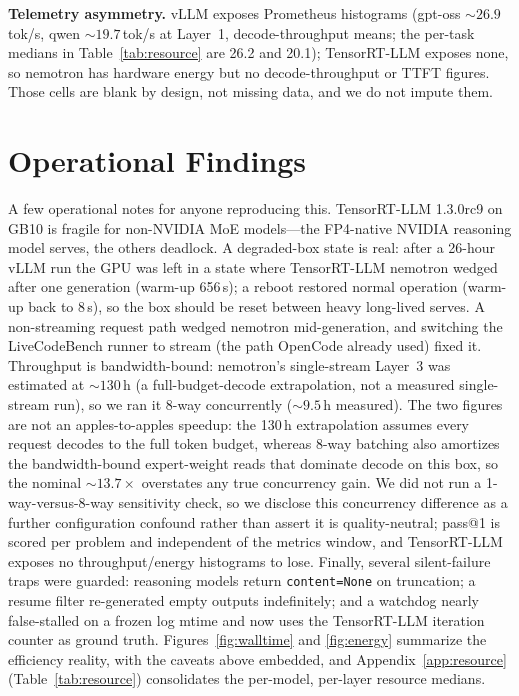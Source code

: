 \documentclass[10pt,twocolumn]{article}
\newcommand{\code}[1]{\texttt{\small #1}}
\begin{document}
\textbf{Telemetry asymmetry.} vLLM exposes Prometheus histograms (gpt-oss ${\sim}26.9$\,tok/s,
qwen ${\sim}19.7$\,tok/s at Layer~1, decode-throughput means; the per-task medians in
Table~\ref{tab:resource} are 26.2 and 20.1); TensorRT-LLM exposes none, so nemotron has hardware
energy but no decode-throughput or TTFT figures. Those cells are blank by design, not missing
data, and we do not impute them.

\section{Operational Findings}
\label{sec:opfindings}

A few operational notes for anyone reproducing this. TensorRT-LLM 1.3.0rc9 on GB10 is
fragile for non-NVIDIA MoE models---the FP4-native NVIDIA reasoning model serves, the others
deadlock. A degraded-box state is real: after a 26-hour vLLM run the GPU was left in a state
where TensorRT-LLM nemotron wedged after one generation (warm-up 656\,s); a reboot restored
normal operation (warm-up back to 8\,s), so the box should be reset between heavy long-lived
serves. A non-streaming request path wedged nemotron mid-generation, and switching the
LiveCodeBench runner to stream (the path OpenCode already used) fixed it. Throughput is
bandwidth-bound: nemotron's single-stream Layer~3 was estimated at ${\sim}130$\,h (a
full-budget-decode extrapolation, not a measured single-stream run), so we ran it 8-way
concurrently (${\sim}9.5$\,h measured). The two figures are not an apples-to-apples speedup: the
130\,h extrapolation assumes every request decodes to the full token budget, whereas 8-way
batching also amortizes the bandwidth-bound expert-weight reads that dominate decode on this box,
so the nominal ${\sim}13.7\times$ overstates any true concurrency gain. We did not run a
1-way-versus-8-way sensitivity check, so we
disclose this concurrency difference as a further configuration confound rather than assert it is
quality-neutral; pass@1 is scored per problem and independent of the metrics window, and
TensorRT-LLM exposes no throughput/energy histograms to lose. Finally, several silent-failure
traps were guarded: reasoning
models return \code{content=None} on truncation; a resume filter re-generated empty outputs
indefinitely; and a watchdog nearly false-stalled on a frozen log mtime and now uses the
TensorRT-LLM iteration counter as ground truth. Figures~\ref{fig:walltime} and
\ref{fig:energy} summarize the efficiency reality, with the caveats above embedded, and
Appendix~\ref{app:resource} (Table~\ref{tab:resource}) consolidates the per-model, per-layer
resource medians.
\end{document}
